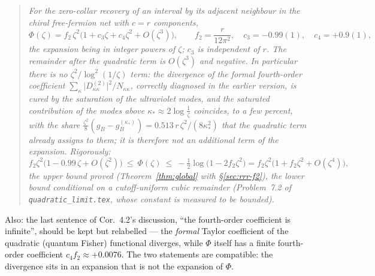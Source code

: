 \documentclass[11pt]{article}
\newcommand{\abs}[1]{\lvert#1\rvert}
\begin{document}
\begin{quote}\itshape
For the zero-collar recovery of an interval by its adjacent neighbour in the chiral free-fermion
net with $c=r$ components,
\[
 \Phi(\zeta)=f_2\,\zeta^2\bigl(1+c_3\zeta+c_4\zeta^2+O(\zeta^3)\bigr),\qquad
 f_2=\frac r{12\pi^2},\quad c_3=-0.99(1),\quad c_4=+0.9(1),
\]
the expansion being in \emph{integer} powers of $\zeta$; $c_3$ is independent of $r$.  The
remainder after the quadratic term is $O(\zeta^3)$ and \emph{negative}.  In particular there is no
$\zeta^2/\log^2(1/\zeta)$ term: the divergence of the formal fourth-order coefficient
$\sum_\kappa\abs{D^{(2)}_{\kappa\kappa}}^2/N_{\kappa\kappa}$, correctly diagnosed in the earlier
version, is cured by the saturation of the ultraviolet modes, and the saturated contribution of the
modes above $\kappa_*\approx2\log\frac1\zeta$ coincides, to a few percent, with the share
$\frac{\zeta^2}8(g_B-g_B^{(\kappa_*)})=0.513\,r\,\zeta^2/(8\kappa_*^2)$ that the quadratic term
already assigns to them; it is therefore not an additional term of the expansion.  Rigorously:
\[
 f_2\zeta^2\bigl(1-0.99\,\zeta+O(\zeta^2)\bigr)\ \le\ \Phi(\zeta)\ \le\
 -\tfrac12\log\bigl(1-2f_2\zeta^2\bigr)=f_2\zeta^2\bigl(1+f_2\zeta^2+O(\zeta^4)\bigr),
\]
the upper bound proved (Theorem~\ref{thm:global} with \S\ref{sec:rrr-f2}), the lower bound
conditional on a cutoff-uniform cubic remainder (Problem~7.2 of
\texttt{quadratic\_limit.tex}, whose constant is measured to be bounded).
\end{quote}

Also: the last sentence of Cor.~4.2's discussion, ``the fourth-order coefficient is infinite'',
should be kept but relabelled --- the \emph{formal} Taylor coefficient of the quadratic (quantum
Fisher) functional diverges, while $\Phi$ itself has a finite fourth-order coefficient
$c_4f_2\approx+0.0076$.  The two statements are compatible: the divergence sits in an expansion
that is not the expansion of $\Phi$.
\end{document}

